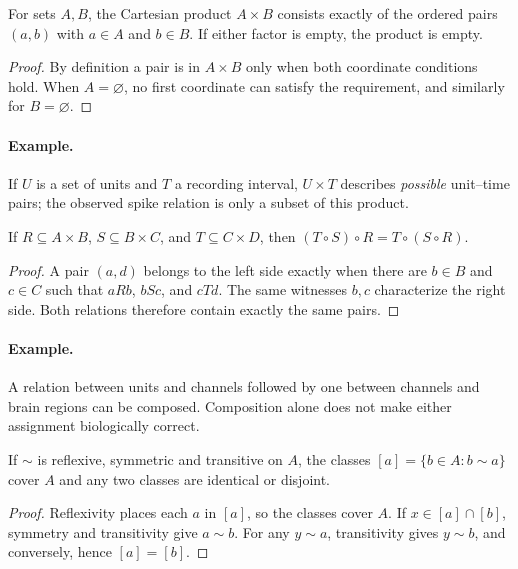 

\begin{proposition}For sets $A,B$, the Cartesian product $A\times B$ consists exactly of the ordered pairs $(a,b)$ with $a\in A$ and $b\in B$. If either factor is empty, the product is empty.\end{proposition}
\begin{proof}By definition a pair is in $A\times B$ only when both coordinate conditions hold. When $A=\varnothing$, no first coordinate can satisfy the requirement, and similarly for $B=\varnothing$.\end{proof}
\paragraph{Example.} If $U$ is a set of units and $T$ a recording interval, $U\times T$ describes \emph{possible} unit--time pairs; the observed spike relation is only a subset of this product.



\begin{proposition}If $R\subseteq A\times B$, $S\subseteq B\times C$, and $T\subseteq C\times D$, then $(T\circ S)\circ R=T\circ(S\circ R)$.\end{proposition}
\begin{proof}A pair $(a,d)$ belongs to the left side exactly when there are $b\in B$ and $c\in C$ such that $aRb$, $bSc$, and $cTd$. The same witnesses $b,c$ characterize the right side. Both relations therefore contain exactly the same pairs.\end{proof}
\paragraph{Example.} A relation between units and channels followed by one between channels and brain regions can be composed. Composition alone does not make either assignment biologically correct.



\begin{proposition}If $\sim$ is reflexive, symmetric and transitive on $A$, the classes $[a]=\{b\in A:b\sim a\}$ cover $A$ and any two classes are identical or disjoint.\end{proposition}
\begin{proof}Reflexivity places each $a$ in $[a]$, so the classes cover $A$. If $x\in[a]\cap[b]$, symmetry and transitivity give $a\sim b$. For any $y\sim a$, transitivity gives $y\sim b$, and conversely, hence $[a]=[b]$.\end{proof}
